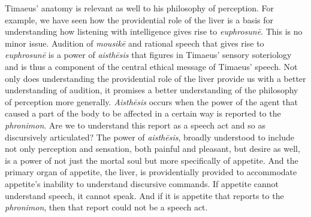 Timaeus' anatomy is relevant as well to his philosophy of perception. For example, we have seen how the providential role of the liver is a basis for understanding how listening with intelligence gives rise to \emph{euphrosunē}. This is no minor issue. Audition of \emph{mousikē} and rational speech that gives rise to \emph{euphrosunē} is a power of \emph{aisthēsis} that figures in Timaeus' sensory soteriology and is thus a component of the central ethical message of Timaeus' speech. Not only does understanding the providential role of the liver provide us with a better understanding of audition, it promises a better understanding of the philosophy of perception more generally. \emph{Aisthēsis} occurs when the power of the agent that caused a part of the body to be affected in a certain way is reported to the \emph{phronimon}. Are we to understand this report as a speech act and so as discursively articulated? The power of \emph{aisthēsis}, broadly understood to include not only perception and sensation, both painful and pleasant, but desire as well, is a power of not just the mortal soul but more specifically of appetite. And the primary organ of appetite, the liver, is providentially provided to accommodate appetite's inability to understand discursive commands. If appetite cannot understand speech, it cannot speak. And if it is appetite that reports to the \emph{phronimon}, then that report could not be a speech act.



